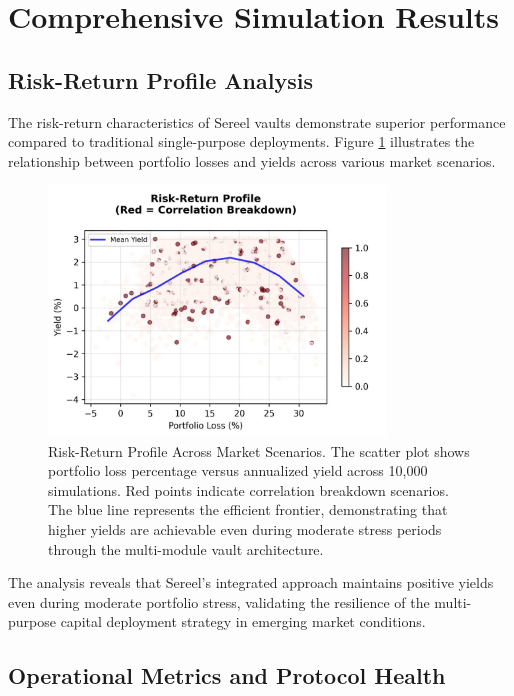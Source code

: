 \documentclass[12pt]{article}
\begin{document}

\appendix

\section{Comprehensive Simulation Results}

\subsection{Risk-Return Profile Analysis}

The risk-return characteristics of Sereel vaults demonstrate superior performance compared to traditional single-purpose deployments. Figure \ref{fig:risk_return_profile} illustrates the relationship between portfolio losses and yields across various market scenarios.

\begin{figure}[h]
    \centering
    \includegraphics[width=0.8\textwidth]{risk_return_profile.jpeg}
    \caption{Risk-Return Profile Across Market Scenarios. The scatter plot shows portfolio loss percentage versus annualized yield across 10,000 simulations. Red points indicate correlation breakdown scenarios. The blue line represents the efficient frontier, demonstrating that higher yields are achievable even during moderate stress periods through the multi-module vault architecture.}
    \label{fig:risk_return_profile}
\end{figure}

The analysis reveals that Sereel's integrated approach maintains positive yields even during moderate portfolio stress, validating the resilience of the multi-purpose capital deployment strategy in emerging market conditions.

\subsection{Operational Metrics and Protocol Health}
\end{document}
